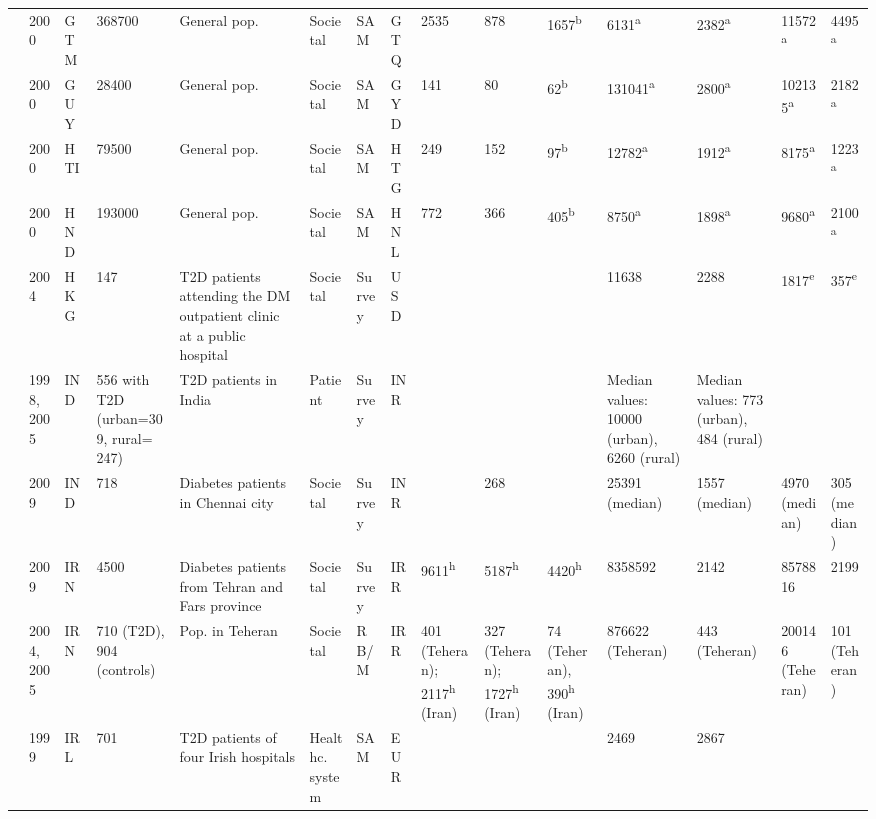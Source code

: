 \documentclass[12pt,english]{article}
\begin{document}
\begin{appendix}
\begin{landscape}
\begin{tabularx}{\linewidth}{Z X X Z Z X X X X X X X X Y Y}
\textcite{Barcelo2003} & 2000 & GTM & 368700 & General pop. & Societal & SAM & GTQ & 2535 & 878 & 1657\textsuperscript{b} & 6131\textsuperscript{a} & 2382\textsuperscript{a} & 11572\textsuperscript{a} & 4495\textsuperscript{a} \\
\textcite{Barcelo2003} & 2000 & GUY & 28400 & General pop. & Societal & SAM & GYD & 141 & 80 & 62\textsuperscript{b} & 131041\textsuperscript{a} & 2800\textsuperscript{a} & 102135\textsuperscript{a} & 2182\textsuperscript{a} \\
\textcite{Barcelo2003} & 2000 & HTI & 79500 & General pop. & Societal & SAM & HTG & 249 & 152 & 97\textsuperscript{b} & 12782\textsuperscript{a} & 1912\textsuperscript{a} & 8175\textsuperscript{a} & 1223\textsuperscript{a} \\
\textcite{Barcelo2003} & 2000 & HND & 193000 & General pop. & Societal & SAM & HNL & 772 & 366 & 405\textsuperscript{b} & 8750\textsuperscript{a} & 1898\textsuperscript{a} & 9680\textsuperscript{a} & 2100\textsuperscript{a} \\
\textcite{Chan2007a} & 2004 & HKG & 147 & T2D patients attending the DM outpatient   clinic at a public hospital & Societal & Survey & USD &  &  &  & 11638 & 2288 & 1817\textsuperscript{e} & 357\textsuperscript{e} \\
\textcite{Ramachandran2007d} & 1998,  2005 & IND & 556 with T2D (urban=309, rural= 247) & T2D patients in India & Patient & Survey & INR &  &  &  & Median values: 10000 (urban), 6260 (rural) & Median values: 773 (urban), 484 (rural) &  &  \\
\textcite{Tharkar2010a} & 2009 & IND & 718 & Diabetes patients in Chennai city & Societal & Survey & INR &  & 268 &  & 25391 (median) & 1557 (median) & 4970 (median) & 305 (median) \\
\textcite{Javanbakht2011b} & 2009 & IRN & 4500 & Diabetes patients from Tehran and Fars   province & Societal & Survey & IRR & 9611\textsuperscript{h} & 5187\textsuperscript{h} & 4420\textsuperscript{h} & 8358592 & 2142 & 8578816 & 2199 \\
\textcite{Esteghamati2009} & 2004, 2005 & IRN & 710 (T2D), 904 (controls) & Pop. in Teheran & Societal & RB/M & IRR & 401 (Teheran); 2117\textsuperscript{h}   (Iran) & 327 (Teheran); 1727\textsuperscript{h}   (Iran) & 74 (Teheran), 390\textsuperscript{h}   (Iran) & 876622 (Teheran) & 443 (Teheran) & 200146 (Teheran) & 101 (Teheran) \\
\textcite{Nolan2006c} & 1999 & IRL & 701 & T2D patients of   four Irish hospitals & Healthc. system & SAM & EUR &  &  &  & 2469 & 2867 &  &  \\

\end{tabularx}
\end{landscape}
\end{appendix}
\end{document}
